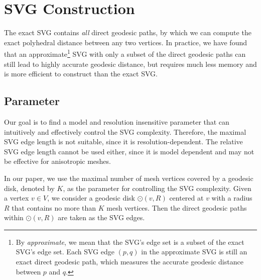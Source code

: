 \section{SVG Construction}
\label{sec:exact}

The exact SVG contains \textit{all} direct geodesic paths, by which
we can compute the exact polyhedral distance between any two
vertices. In practice, we have found that an approximate\footnote{By
\textit{approximate}, we mean that the SVG's edge set is a subset of
the exact SVG's edge set. Each SVG edge $(p,q)$ in the approximate
SVG is still an exact direct geodesic path, which measures the
accurate geodesic distance between $p$ and $q$.} SVG with only a
subset of the direct geodesic paths can still lead to highly
accurate geodesic distance, but requires much less memory and is
more efficient to construct than the exact SVG.

\subsection{Parameter}

Our goal is to find a model and resolution insensitive parameter
that can intuitively and effectively control the SVG complexity.
Therefore, the maximal SVG edge length is not suitable, since it is
resolution-dependent. The relative SVG edge length cannot be used
either, since it is model dependent and may not be effective for
anisotropic meshes.

In our paper, we use the maximal number of mesh vertices covered by
a geodesic disk, denoted by $K$, as the parameter for controlling
the SVG complexity. Given a vertex $v\in V$, we consider a geodesic
disk $\odot(v,R)$ centered at $v$ with a radius $R$ that contains no
more than $K$ mesh vertices. Then the direct geodesic paths within
$\odot(v,R)$ are taken as the SVG edges.

